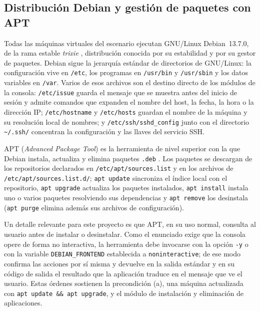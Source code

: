 \subsection{Distribución Debian y gestión de paquetes con APT}
\label{sec:mt-debian-apt}

Todas las máquinas virtuales del escenario ejecutan GNU/Linux
Debian~13.7.0, de la rama estable \emph{trixie} \parencite{debian},
distribución conocida por su estabilidad y por su gestor de paquetes.
Debian sigue la jerarquía estándar de directorios de GNU/Linux: la
configuración vive en \texttt{/etc}, los programas en \texttt{/usr/bin}
y \texttt{/usr/sbin} y los datos variables en \texttt{/var}. Varios de
esos archivos son el destino directo de los módulos de la consola:
\texttt{/etc/issue} guarda el mensaje que se muestra antes del inicio de
sesión y admite comandos que expanden el nombre del host, la fecha, la
hora o la dirección IP; \texttt{/etc/hostname} y \texttt{/etc/hosts}
guardan el nombre de la máquina y su resolución local de nombres; y
\texttt{/etc/ssh/sshd\_config} junto con el directorio
\texttt{\textasciitilde/.ssh/} concentran la configuración y las llaves
del servicio SSH.

APT (\emph{Advanced Package Tool}) es la herramienta de nivel superior
con la que Debian instala, actualiza y elimina paquetes \texttt{.deb}
\parencite{apt}. Los paquetes se descargan de los repositorios
declarados en \texttt{/etc/apt/sources.list} y en los archivos de
\texttt{/etc/apt/sources.list.d/}; \texttt{apt update} sincroniza el
índice local con el repositorio, \texttt{apt upgrade} actualiza los
paquetes instalados, \texttt{apt install} instala uno o varios paquetes
resolviendo sus dependencias y \texttt{apt remove} los desinstala
(\texttt{apt purge} elimina además sus archivos de configuración).

Un detalle relevante para este proyecto es que APT, en su uso normal,
consulta al usuario antes de instalar o desinstalar. Como el enunciado
exige que la consola opere de forma no interactiva, la herramienta debe
invocarse con la opción \texttt{-y} o con la variable
\texttt{DEBIAN\_FRONTEND} establecida a \texttt{noninteractive}; de ese
modo confirma las acciones por sí misma y devuelve en la salida
estándar y en su código de salida el resultado que la aplicación traduce
en el mensaje que ve el usuario. Estas órdenes sostienen la precondición
(a), una máquina actualizada con \texttt{apt update \&\& apt upgrade}, y
el módulo de instalación y eliminación de aplicaciones.


